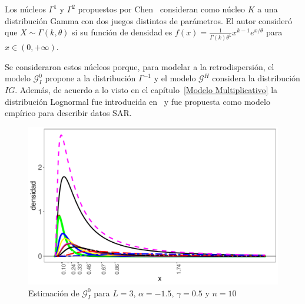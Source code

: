 Los núcleos $\Gamma^1$ y $\Gamma^2$ propuestos por Chen~\cite{chensx2000} consideran como núcleo $K$ a una distribución Gamma con dos juegos distintos de parámetros. El autor consideró que $X \sim \Gamma(k,\theta)$ si su función de densidad es $f(x)=\frac{1}{\Gamma(k) \theta^k} x^{k-1} e^{x/\theta}$ para $x \in (0,+\infty)$. 

Se consideraron estos núcleos porque, para modelar a la retrodispersión, el modelo $\mathcal{G}_I^0$ propone a la distribución $\Gamma^{-1}$ y el modelo $\mathcal{G}^H$ considera la distribución $IG$. Además, de acuerdo a lo visto en el capítulo~\ref{Modelo Multiplicativo} la distribución Lognormal fue introducida en~\cite{oliverquegan98} y fue propuesta como modelo empírico para describir datos SAR.



\begin{figure}[hbt]
	\centering
	\includegraphics[scale=0.5]{../../Figures/Tesis/Capitulo5/EstimacionDensidadconLN.pdf}
	\caption{\label{EstimacionLN}Estimación de $\mathcal{G}_I^0$ para $L=3$, $\alpha=-1.5$, $\gamma=0.5$ y $n=10$}
\end{figure}

